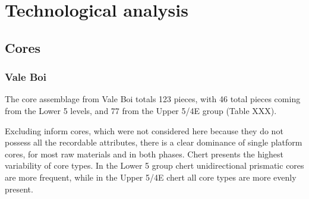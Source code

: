 \documentclass[12pt,twoside]{reedthesis}
\begin{document}
\begin{table}

\caption{\label{tab:cortextabpr}Lapa do Picareiro - Middle T. Frequencies of cortex type by raw material.}
\centering
{}
\end{table}
\hypertarget{technological-analysis}{%
\section{Technological analysis}\label{technological-analysis}}

\hypertarget{cores}{%
\subsection{Cores}\label{cores}}

\hypertarget{vale-boi-4}{%
\subsubsection{Vale Boi}\label{vale-boi-4}}

The core assemblage from Vale Boi totals 123 pieces, with 46 total pieces coming from the Lower 5 levels, and 77 from the Upper 5/4E group (Table XXX).

Excluding inform cores, which were not considered here because they do not possess all the recordable attributes, there is a clear dominance of single platform cores, for most raw materials and in both phases. Chert presents the highest variability of core types. In the Lower 5 group chert unidirectional prismatic cores are more frequent, while in the Upper 5/4E chert all core types are more evenly present.
\end{document}

